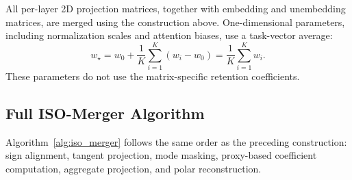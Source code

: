 \documentclass[11pt, a4paper]{utda}
\theoremstyle{plain}
\theoremstyle{definition}
\theoremstyle{remark}
\begin{document}
All per-layer 2D projection matrices, together with embedding and
unembedding matrices, are merged using the construction above.
One-dimensional parameters, including normalization scales and
attention biases, use a task-vector average:
\begin{equation}
\label{eq:app_iso_merger_1d_average}
    w_\star
    =w_0+\frac1K\sum_{i=1}^K(w_i-w_0)
    =\frac1K\sum_{i=1}^K w_i.
\end{equation}
These parameters do not use the matrix-specific retention coefficients.

\subsection{Full ISO-Merger Algorithm}
\label{app:iso_merger_algorithm}

Algorithm~\ref{alg:iso_merger} follows the same order as the preceding
construction: sign alignment, tangent projection, mode masking,
proxy-based coefficient computation, aggregate projection, and
polar reconstruction.
\end{document}
